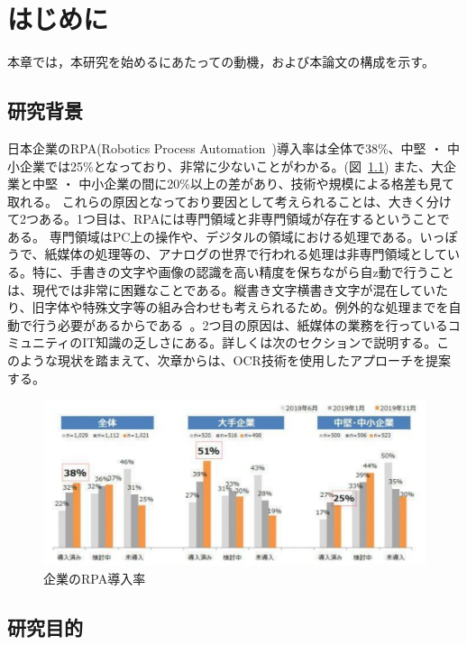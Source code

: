 \chapter{はじめに}
\label{ch:intro}

\quad

本章では，本研究を始めるにあたっての動機，および本論文の構成を示す。

\section{研究背景}
\label{sec:research_bg}

日本企業のRPA(Robotics Process Automation~\cite{yasuhiro2017rpa})導入率は全体で38\%、中堅 ・ 中小企業では25\%となっており、非常に少ないことがわかる。(図~\ref{fig:rpa_rate})
また、大企業と中堅 ・ 中小企業の間に20\%以上の差があり、技術や規模による格差も見て取れる。
これらの原因となっており要因として考えられることは、大きく分けて2つある。1つ目は、RPAには専門領域と非専門領域が存在するということである。
専門領域はPC上の操作や、デジタルの領域における処理である。いっぽうで、紙媒体の処理等の、アナログの世界で行われる処理は非専門領域としている。特に、手書きの文字や画像の認識を高い精度を保ちながら自z動で行うことは、現代では非常に困難なことである。縦書き文字横書き文字が混在していたり、旧字体や特殊文字等の組み合わせも考えられるため。例外的な処理までを自動で行う必要があるからである~\cite{d-analyzer2019rpa}。2つ目の原因は、紙媒体の業務を行っているコミュニティのIT知識の乏しさにある。詳しくは次のセクションで説明する。このような現状を踏まえて、次章からは、OCR技術を使用したアプローチを提案する。

\clearpage
\begin{figure}[htbp]
\centering
\includegraphics[scale = 0.6]{img/rpa_rate.pdf}
\caption{企業のRPA導入率}
\label{fig:rpa_rate}
\end{figure}%

\section{研究目的}
\label{sec:research_purpose}

